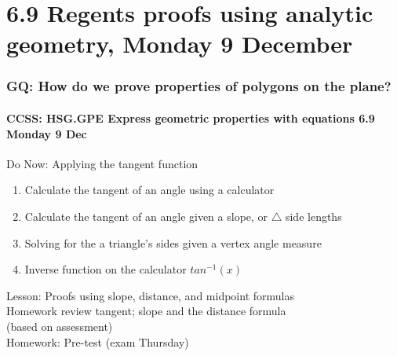 \documentclass{beamer}
\begin{document}
\section{6.9 Regents proofs using analytic geometry, Monday 9 December}
\frame
{
  \frametitle{GQ: How do we prove properties of polygons on the plane?}
  \framesubtitle{CCSS: HSG.GPE Express geometric properties with equations \hfill \alert{6.9 Monday 9 Dec}}

  \begin{block}{Do Now: Applying the tangent function}
  \begin{enumerate}
    \item Calculate the tangent of an angle using a calculator
    \item Calculate the tangent of an angle given a slope, or $\triangle$ side lengths
    \item Solving for the a triangle's sides given a vertex angle measure
    \item Inverse function on the calculator $tan^{-1}(x)$
  \end{enumerate}
  \end{block}
  Lesson: Proofs using slope, distance, and midpoint formulas \\
  Homework review tangent; slope and the distance formula \\(based on assessment)\\[0.25cm]
  Homework: Pre-test (\alert{exam Thursday})
}
\end{document}
